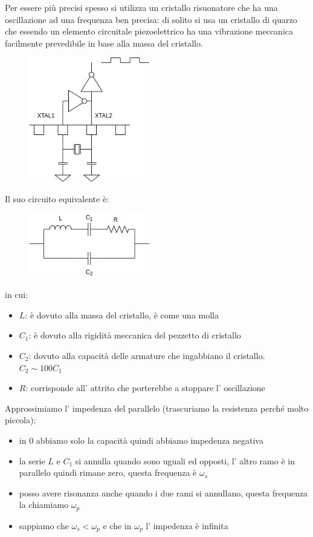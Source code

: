 Per essere più precisi spesso si utilizza un cristallo risuonatore che ha una oscillazione ad una frequenza ben precisa: di solito si usa un cristallo di quarzo che essendo un elemento circuitale piezoelettrico ha una vibrazione meccanica facilmente prevedibile in base alla massa del cristallo.
\begin{figure}[H]
    \centering
    \includegraphics[width=200px]{images/17_Clock/crystal_oscillator.png}
\end{figure}
Il suo circuito equivalente è:
\begin{figure}[H]
    \centering
    \includegraphics[width=200px]{images/17_Clock/equivalent_circuit.png}
\end{figure}
in cui:
\begin{itemize}
    \item $L$: è dovuto alla massa del cristallo, è come una molla
    \item $C_1$: è dovuto alla rigidità meccanica del pezzetto di cristallo
    \item $C_2$: dovuto alla capacità delle armature che ingabbiano il cristallo. $C_2 \sim 100C_1$
    \item $R$: corrisponde all' attrito che porterebbe a stoppare l' oscillazione
\end{itemize}
Approssimiamo l' impedenza del parallelo (trascuriamo la resistenza perché molto piccola):
\begin{itemize}
    \item in 0 abbiamo solo la capacità quindi abbiamo impedenza negativa
    \item la serie $L$ e $C_1$ si annulla quando sono uguali ed opposti, l' altro ramo è in parallelo quindi rimane zero, questa frequenza è $\omega_s$
    \item posso avere risonanza anche quando i due rami si annullano, questa frequenza la chiamiamo $\omega_p$
    \item sappiamo che $\omega_s < \omega_p$ e che in $\omega_p$ l' impedenza è infinita
\end{itemize}
